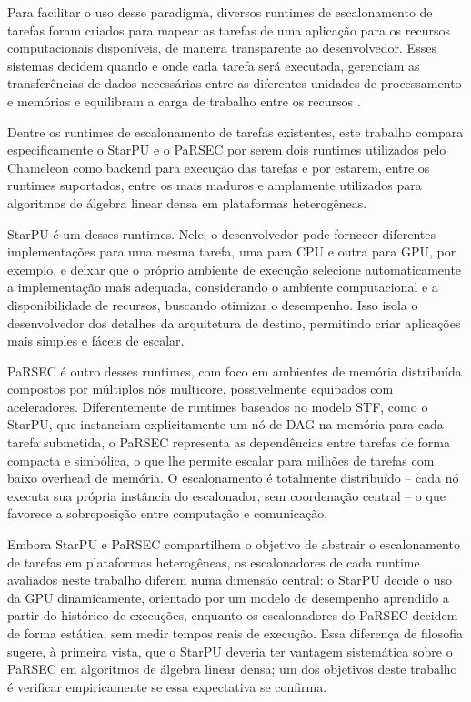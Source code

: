 \documentclass[12pt]{article}
\begin{document}
Para facilitar o uso desse paradigma, diversos runtimes de escalonamento de
tarefas foram criados para mapear as tarefas de uma aplicação para os recursos
computacionais disponíveis, de maneira transparente ao desenvolvedor. Esses sistemas
decidem quando e onde cada tarefa será executada, gerenciam as transferências de
dados necessárias entre as diferentes unidades de processamento e memórias e
equilibram a carga de trabalho entre os recursos \cite{aguerrebere2018hdr}.

Dentre os runtimes de escalonamento de tarefas existentes, este trabalho compara
especificamente o StarPU e o PaRSEC por serem dois runtimes utilizados pelo
Chameleon como backend para execução das tarefas e por estarem, entre os
runtimes suportados, entre os mais maduros e amplamente utilizados para
algoritmos de álgebra linear densa em plataformas heterogêneas.

StarPU \cite{starpu} é um desses runtimes. Nele, o desenvolvedor pode fornecer
diferentes implementações para uma mesma tarefa, uma para CPU e outra para GPU,
por exemplo, e deixar que o próprio ambiente de execução selecione
automaticamente a implementação mais adequada, considerando o ambiente
computacional e a disponibilidade de recursos, buscando otimizar o desempenho.
Isso isola o desenvolvedor dos detalhes da arquitetura de destino, permitindo
criar aplicações mais simples e fáceis de escalar.

PaRSEC \cite{bosilca2011dague} é outro desses runtimes, com foco em ambientes de
memória distribuída compostos por múltiplos nós multicore, possivelmente
equipados com aceleradores. Diferentemente de runtimes baseados no modelo STF,
como o StarPU, que instanciam explicitamente um nó de DAG na memória para cada
tarefa submetida, o PaRSEC representa as dependências entre tarefas de forma
compacta e simbólica, o que lhe permite escalar para milhões de tarefas com
baixo overhead de memória. O escalonamento é totalmente distribuído -- cada nó
executa sua própria instância do escalonador, sem coordenação central -- o que
favorece a sobreposição entre computação e comunicação.

Embora StarPU e PaRSEC compartilhem o objetivo de abstrair o escalonamento de
tarefas em plataformas heterogêneas, os escalonadores de cada runtime avaliados
neste trabalho diferem numa dimensão central: o StarPU decide o uso da GPU
dinamicamente, orientado por um modelo de desempenho aprendido a partir do
histórico de execuções, enquanto os escalonadores do PaRSEC decidem de forma
estática, sem medir tempos reais de execução. Essa diferença de filosofia
sugere, à primeira vista, que o StarPU deveria ter vantagem sistemática sobre o
PaRSEC em algoritmos de álgebra linear densa; um dos objetivos deste trabalho é
verificar empiricamente se essa expectativa se confirma.
\end{document}
